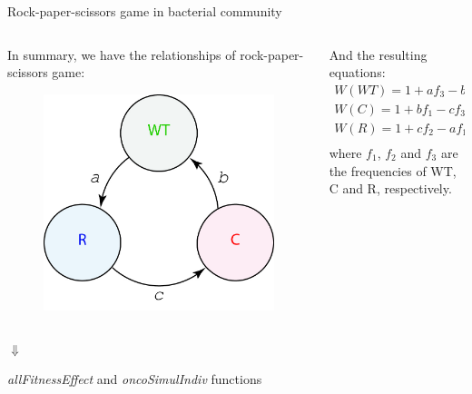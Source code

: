 \begin{frame}{Rock-paper-scissors game in bacterial community}
	\begin{columns}
		\begin{column}{0.5\textwidth}
			\begin{center}
				In summary, we have the relationships of rock-paper-scissors game:
			\end{center}
			\begin{figure}
				\includegraphics[scale=0.12]{img/figure_rock-scissor-paper.jpg}			
			\end{figure}
		\end{column}
		\begin{column}{0.5\textwidth}
			\begin{center}
				And the resulting equations:
			\begin{align*}
				W\left(WT\right) = 1 + af_3 - bf_2\\
				W\left(C\right) = 1 + bf_1 - cf_3\\
				W\left(R\right) = 1 + cf_2 - af_1\\
			\end{align*}
			where $f_1$, $f_2$ and $f_3$ are the frequencies of WT, C and R, respectively. 
			\end{center}
		\end{column}
	\end{columns}
	\pause
	\begin{center}
		{\LARGE $\Downarrow$\\}
		\begin{block}
			{\centering
				\textit{allFitnessEffect} and \textit{oncoSimulIndiv} functions
			}
		\end{block}
	\end{center}	
\end{frame}


